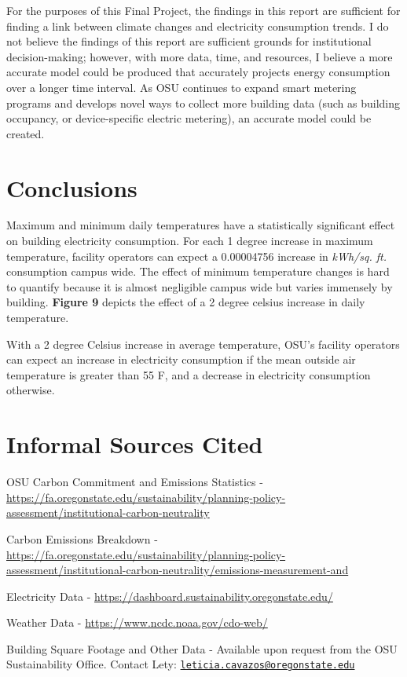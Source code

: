 \documentclass[
]{article}
\begin{document}
For the purposes of this Final Project, the findings in this report are
sufficient for finding a link between climate changes and electricity
consumption trends. I do not believe the findings of this report are
sufficient grounds for institutional decision-making; however, with more
data, time, and resources, I believe a more accurate model could be
produced that accurately projects energy consumption over a longer time
interval. As OSU continues to expand smart metering programs and
develops novel ways to collect more building data (such as building
occupancy, or device-specific electric metering), an accurate model
could be created.

\hypertarget{conclusions}{%
\section{Conclusions}\label{conclusions}}

Maximum and minimum daily temperatures have a statistically significant
effect on building electricity consumption. For each 1 degree increase
in maximum temperature, facility operators can expect a 0.00004756
increase in \emph{kWh/sq. ft.} consumption campus wide. The effect of
minimum temperature changes is hard to quantify because it is almost
negligible campus wide but varies immensely by building. \textbf{Figure
9} depicts the effect of a 2 degree celsius increase in daily
temperature.

With a 2 degree Celsius increase in average temperature, OSU's facility
operators can expect an increase in electricity consumption if the mean
outside air temperature is greater than 55 F, and a decrease in
electricity consumption otherwise.

\hypertarget{informal-sources-cited}{%
\section{Informal Sources Cited}\label{informal-sources-cited}}

OSU Carbon Commitment and Emissions Statistics -
\url{https://fa.oregonstate.edu/sustainability/planning-policy-assessment/institutional-carbon-neutrality}

Carbon Emissions Breakdown -
\url{https://fa.oregonstate.edu/sustainability/planning-policy-assessment/institutional-carbon-neutrality/emissions-measurement-and}

Electricity Data -
\url{https://dashboard.sustainability.oregonstate.edu/}

Weather Data - \url{https://www.ncdc.noaa.gov/cdo-web/}

Building Square Footage and Other Data - Available upon request from the
OSU Sustainability Office. Contact Lety:
\href{mailto:leticia.cavazos@oregonstate.edu}{\nolinkurl{leticia.cavazos@oregonstate.edu}}
\end{document}

